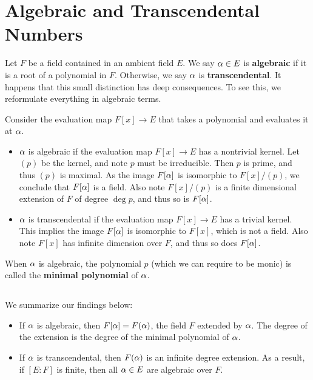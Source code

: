 \section{Algebraic and Transcendental Numbers}
Let $F$ be a field contained in an ambient field $E$. We say $\alpha \in E$ is \textbf{algebraic} if it is a root of a polynomial in $F$. Otherwise, we say $\alpha$ is \textbf{transcendental}. It happens that this small distinction has deep consequences. To see this, we reformulate everything in algebraic terms.

Consider the evaluation map $F[x] \rightarrow E$ that takes a polynomial and evaluates it at $\alpha$.
\begin{itemize}
    \item $\alpha$ is algebraic if the evaluation map $F[x] \rightarrow E$ has a nontrivial kernel. Let $(p)$ be the kernel, and note $p$ must be irreducible. Then $p$ is prime, and thus $(p)$ is maximal. As the image $F[\alpha]$ is isomorphic to $F[x]/(p)$, we conclude that $F[\alpha]$ is a field. Also note $F[x]/(p)$ is a finite dimensional extension of $F$ of degree $\deg p$, and thus so is $F[\alpha]$.
    \item $\alpha$ is transcendental if the evaluation map $F[x] \rightarrow E$ has a trivial kernel. This implies the image $F[\alpha]$ is isomorphic to $F[x]$, which is not a field. Also note $F[x]$ has infinite dimension over $F$, and thus so does $F[\alpha]$.
\end{itemize}
When $\alpha$ is algebraic, the polynomial $p$ (which we can require to be monic) is called the \textbf{minimal polynomial} of $\alpha$.

\subsection{}
We summarize our findings below:
\begin{itemize}
    \item If $\alpha$ is algebraic, then $F[\alpha] = F(\alpha)$, the field $F$ extended by $\alpha$. The degree of the extension is the degree of the minimal polynomial of $\alpha$.
    \item If $\alpha$ is transcendental, then $F(\alpha)$ is an infinite degree extension. As a result, if $[E : F]$ is finite, then all $\alpha \in E$ are algebraic over $F$.
\end{itemize}
